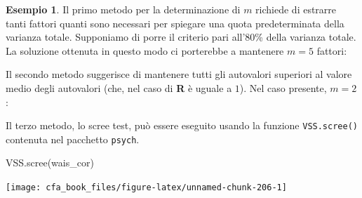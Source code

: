 \documentclass[
  11pt,
]{krantz}
\makeatletter
\newenvironment{Shaded}{\begin{snugshade}}{\end{snugshade}}
\newcommand{\CommentTok}[1]{\textcolor[rgb]{0.37,0.37,0.37}{\textit{#1}}}
\newcommand{\DecValTok}[1]{\textcolor[rgb]{0.06,0.06,0.06}{#1}}
\newcommand{\FunctionTok}[1]{\textcolor[rgb]{0,0,0}{#1}}
\newcommand{\NormalTok}[1]{#1}
\newcommand{\OtherTok}[1]{\textcolor[rgb]{0.37,0.37,0.37}{#1}}
\newcommand{\SpecialCharTok}[1]{\textcolor[rgb]{0,0,0}{#1}}
\newenvironment{kframe}{%
\medskip{}
\setlength{\fboxsep}{.8em}
 \def\at@end@of@kframe{}%
 \ifinner\ifhmode%
  \def\at@end@of@kframe{\end{minipage}}%
  \begin{minipage}{\columnwidth}%
 \fi\fi%
 \def\FrameCommand##1{\hskip\@totalleftmargin \hskip-\fboxsep
 \colorbox{shadecolor}{##1}\hskip-\fboxsep
     \hskip-\linewidth \hskip-\@totalleftmargin \hskip\columnwidth}%
 \MakeFramed {\advance\hsize-\width
   \@totalleftmargin\z@ \linewidth\hsize
   \@setminipage}}%
 {\par\unskip\endMakeFramed%
 \at@end@of@kframe}
\renewenvironment{Shaded}{\begin{kframe}}{\end{kframe}}
\theoremstyle{definition}
\theoremstyle{definition}
\newtheorem{example}{Esempio}[chapter]
\theoremstyle{definition}
\theoremstyle{definition}
\theoremstyle{remark}
\makeatother
\begin{document}
\begin{example}
Il primo metodo per la determinazione di \(m\) richiede di estrarre tanti fattori quanti sono necessari per spiegare una quota predeterminata della varianza totale. Supponiamo di porre il criterio pari all'80\% della varianza totale. La soluzione ottenuta in questo modo ci porterebbe a mantenere \(m=5\) fattori:

\begin{Shaded}
\end{Shaded}

Il secondo metodo suggerisce di mantenere tutti gli autovalori superiori al valore medio degli autovalori (che, nel caso di \textbf{R} è uguale a \(1\)). Nel caso presente, \(m=2\):

\begin{Shaded}
\end{Shaded}

Il terzo metodo, lo scree test, può essere eseguito usando la funzione \texttt{VSS.scree()} contenuta nel pacchetto \texttt{psych}.

\begin{Shaded}
\begin{Highlighting}[]
\FunctionTok{VSS.scree}\NormalTok{(wais\_cor)}
\end{Highlighting}
\end{Shaded}

\begin{center}\texttt{[image: cfa\_book\_files/figure-latex/unnamed-chunk-206-1]} \end{center}


\end{example}
\end{document}
